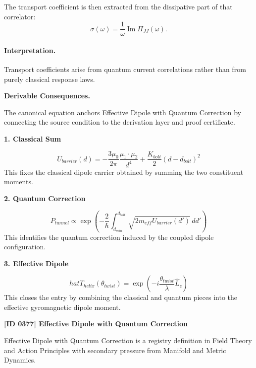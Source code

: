 The transport coefficient is then extracted from the dissipative part of that correlator:
\begin{equation}
\boxed{
\sigma(\omega)
=
\frac{1}{\omega}
\operatorname{Im}\Pi_{JJ}(\omega).
}
\end{equation}

\paragraph{Interpretation.}
Transport coefficients arise from quantum current correlations rather than from purely classical response laws.

\par\vspace{0.35em}
\noindent\textbf{Derivable Consequences.}\quad
\begingroup
\footnotesize
\raggedright
The canonical equation anchors Effective Dipole with Quantum Correction by connecting the source condition to the derivation layer and proof certificate.
\par\endgroup

\noindent\textbf{1. Classical Sum}\par
\[
U_{barrier}(d) = -\frac{3\mu_0}{2\pi}\frac{\mu_1 \cdot \mu_2}{d^4} + \frac{K_{bolt}}{2}(d - d_{bolt})^2
\]
\noindent This fixes the classical dipole carrier obtained by summing the two constituent moments.\par
\noindent\textbf{2. Quantum Correction}\par
\[
P_{tunnel} \propto \exp\left(-\frac{2}{\hbar}\int_{d_{min}}^{d_{bolt}} \sqrt{2m_{eff}U_{barrier}(d')} \, dd'\right)
\]
\noindent This identifies the quantum correction induced by the coupled dipole configuration.\par
\noindent\textbf{3. Effective Dipole}\par
\[
hat{T}_{helix}(\theta_{twist}) = \exp\left(-i\frac{\theta_{twist}}{\lambda}\hat{L}_z\right)
\]
\noindent This closes the entry by combining the classical and quantum pieces into the effective gyromagnetic dipole moment.\par

\clearpage
\noindent\textbf{[ID 0377] Effective Dipole with Quantum Correction}\par
\vspace{0.35em}
\begingroup\small
{}
Effective Dipole with Quantum Correction is a registry definition in Field Theory and Action Principles with secondary pressure from Manifold and Metric Dynamics.

